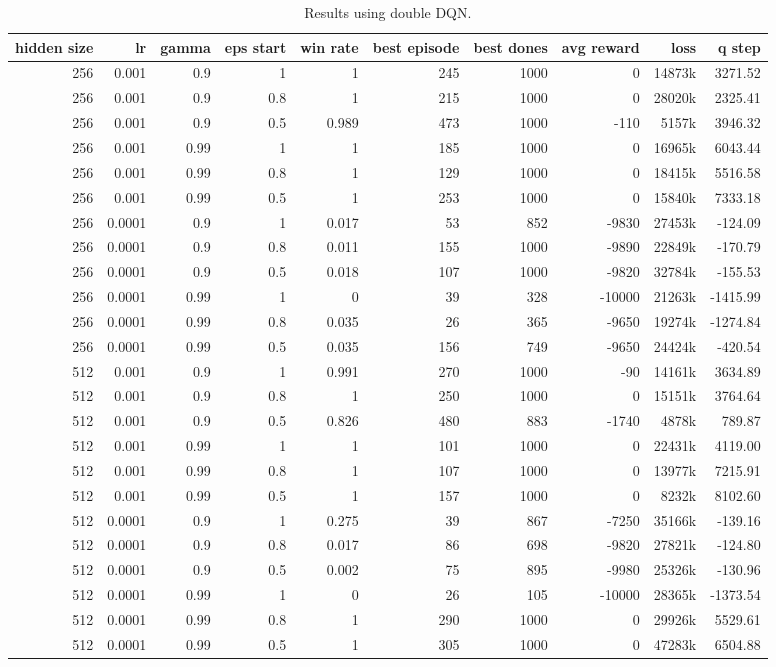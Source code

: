 \begin{table}
	\centering
	\scriptsize
	\begin{tabular}{r r r r | r r r r r r}
		\toprule
			hidden size & lr & gamma & eps start & win rate & best episode & best dones & avg reward & loss & q step \\
		\midrule
			256 & 0.001 & 0.9 & 1 & 1 & 245 & 1000 & 0 & 14873k & 3271.52 \\
			256 & 0.001 & 0.9 & 0.8 & 1 & 215 & 1000 & 0 & 28020k & 2325.41 \\
			256 & 0.001 & 0.9 & 0.5 & 0.989 & 473 & 1000 & -110 & 5157k & 3946.32 \\
			256 & 0.001 & 0.99 & 1 & 1 & 185 & 1000 & 0 & 16965k & 6043.44 \\
			256 & 0.001 & 0.99 & 0.8 & 1 & 129 & 1000 & 0 & 18415k & 5516.58 \\
			256 & 0.001 & 0.99 & 0.5 & 1 & 253 & 1000 & 0 & 15840k & 7333.18 \\
			256 & 0.0001 & 0.9 & 1 & 0.017 & 53 & 852 & -9830 & 27453k & -124.09 \\
			256 & 0.0001 & 0.9 & 0.8 & 0.011 & 155 & 1000 & -9890 & 22849k & -170.79 \\
			256 & 0.0001 & 0.9 & 0.5 & 0.018 & 107 & 1000 & -9820 & 32784k & -155.53 \\
			256 & 0.0001 & 0.99 & 1 & 0 & 39 & 328 & -10000 & 21263k & -1415.99 \\
			256 & 0.0001 & 0.99 & 0.8 & 0.035 & 26 & 365 & -9650 & 19274k & -1274.84 \\
			256 & 0.0001 & 0.99 & 0.5 & 0.035 & 156 & 749 & -9650 & 24424k & -420.54 \\
			512 & 0.001 & 0.9 & 1 & 0.991 & 270 & 1000 & -90 & 14161k & 3634.89 \\
			512 & 0.001 & 0.9 & 0.8 & 1 & 250 & 1000 & 0 & 15151k & 3764.64 \\
			512 & 0.001 & 0.9 & 0.5 & 0.826 & 480 & 883 & -1740 & 4878k & 789.87 \\
			512 & 0.001 & 0.99 & 1 & 1 & 101 & 1000 & 0 & 22431k & 4119.00 \\
			512 & 0.001 & 0.99 & 0.8 & 1 & 107 & 1000 & 0 & 13977k & 7215.91 \\
			512 & 0.001 & 0.99 & 0.5 & 1 & 157 & 1000 & 0 & 8232k & 8102.60 \\
			512 & 0.0001 & 0.9 & 1 & 0.275 & 39 & 867 & -7250 & 35166k & -139.16 \\
			512 & 0.0001 & 0.9 & 0.8 & 0.017 & 86 & 698 & -9820 & 27821k & -124.80 \\
			512 & 0.0001 & 0.9 & 0.5 & 0.002 & 75 & 895 & -9980 & 25326k & -130.96 \\
			512 & 0.0001 & 0.99 & 1 & 0 & 26 & 105 & -10000 & 28365k & -1373.54 \\
			512 & 0.0001 & 0.99 & 0.8 & 1 & 290 & 1000 & 0 & 29926k & 5529.61 \\
			512 & 0.0001 & 0.99 & 0.5 & 1 & 305 & 1000 & 0 & 47283k & 6504.88 \\
		\bottomrule
	\end{tabular}
	\caption{Results using double DQN.}
	\label{ddqn_results}
\end{table}

